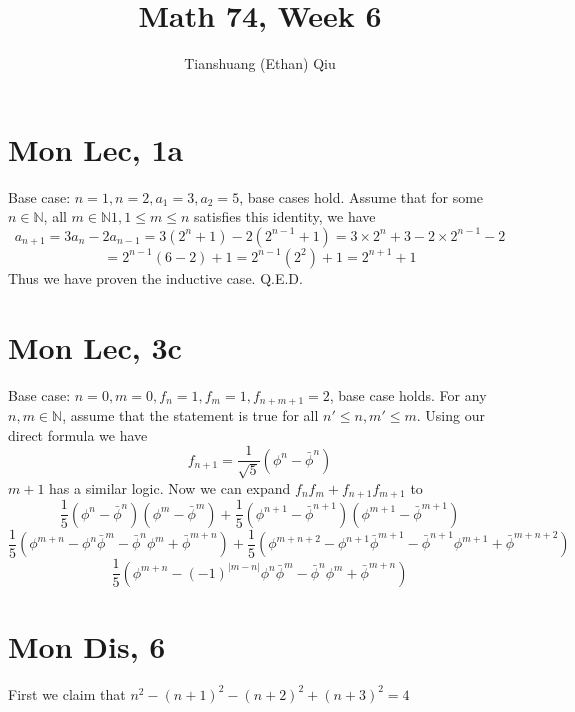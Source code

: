 \documentclass[12pt]{article}
\author{Tianshuang (Ethan) Qiu}
\newcommand{\N}{\mathbb{N}}
\begin{document}
\title{Math 74, Week 6}
\maketitle

\section{Mon Lec, 1a}
Base case: $n=1, n=2, a_1=3, a_2=5$, base cases hold.
\newline
Assume that for some $n \in \N$, all $m \in \N 1, 1 \leq m \leq n$ satisfies this identity, we have
$$a_{n+1}=3a_n-2a_{n-1}=3(2^n+1)-2(2^{n-1}+1)=3\times 2^n+3-2\times 2^{n-1}-2$$
$$=2^{n-1}(6-2)+1=2^{n-1}(2^2)+1=2^{n+1}+1$$
Thus we have proven the inductive case. Q.E.D.

\section{Mon Lec, 3c}
Base case: $n=0, m=0, f_n=1, f_m=1, f_{n+m+1}=2$, base case holds.
\newline
For any $n, m \in \N$, assume that the statement is true for all $n'\leq n, m' \leq m$. Using our direct formula we have
$$f_{n+1}=\frac{1}{\sqrt 5} (\phi^n - \bar \phi^n)$$
$m+1$ has a similar logic. Now we can expand $f_nf_m+f_{n+1}f_{m+1}$ to
$$\frac{1}{5}(\phi^n - \bar \phi^n)(\phi^m - \bar \phi^m) + \frac{1}{5}(\phi^{n+1} - \bar \phi^{n+1})(\phi^{m+1} - \bar \phi^{m+1})$$
$$\frac{1}{5}(\phi^{m+n} - \phi^n \bar\phi^m - \bar\phi^n\phi^m + \bar \phi^{m+n}) + \frac{1}{5}(\phi^{m+n+2} - \phi^{n+1} \bar\phi^{m+1} - \bar\phi^{n+1}\phi^{m+1} + \bar \phi^{m+n+2})$$
$$\frac{1}{5}(\phi^{m+n} - (-1)^{|m-n|}\phi^n \bar\phi^m - \bar\phi^n\phi^m + \bar \phi^{m+n})$$


\section{Mon Dis, 6}
First we claim that $n^2-(n+1)^2-(n+2)^2+(n+3)^2=4$
\end{document}
